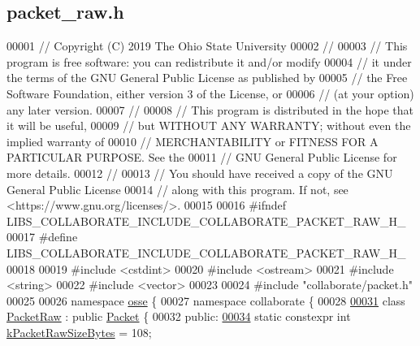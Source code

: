 \hypertarget{packet__raw_8h_source}{}\subsection{packet\+\_\+raw.\+h}
\label{packet__raw_8h_source}

\begin{DoxyCode}
00001 \textcolor{comment}{// Copyright (C) 2019 The Ohio State University}
00002 \textcolor{comment}{//}
00003 \textcolor{comment}{// This program is free software: you can redistribute it and/or modify}
00004 \textcolor{comment}{// it under the terms of the GNU General Public License as published by}
00005 \textcolor{comment}{// the Free Software Foundation, either version 3 of the License, or}
00006 \textcolor{comment}{// (at your option) any later version.}
00007 \textcolor{comment}{//}
00008 \textcolor{comment}{// This program is distributed in the hope that it will be useful,}
00009 \textcolor{comment}{// but WITHOUT ANY WARRANTY; without even the implied warranty of}
00010 \textcolor{comment}{// MERCHANTABILITY or FITNESS FOR A PARTICULAR PURPOSE.  See the}
00011 \textcolor{comment}{// GNU General Public License for more details.}
00012 \textcolor{comment}{//}
00013 \textcolor{comment}{// You should have received a copy of the GNU General Public License}
00014 \textcolor{comment}{// along with this program.  If not, see <https://www.gnu.org/licenses/>.}
00015 
00016 \textcolor{preprocessor}{#ifndef LIBS\_COLLABORATE\_INCLUDE\_COLLABORATE\_PACKET\_RAW\_H\_}
00017 \textcolor{preprocessor}{#define LIBS\_COLLABORATE\_INCLUDE\_COLLABORATE\_PACKET\_RAW\_H\_}
00018 
00019 \textcolor{preprocessor}{#include <cstdint>}
00020 \textcolor{preprocessor}{#include <ostream>}
00021 \textcolor{preprocessor}{#include <string>}
00022 \textcolor{preprocessor}{#include <vector>}
00023 
00024 \textcolor{preprocessor}{#include "collaborate/packet.h"}
00025 
00026 \textcolor{keyword}{namespace }\hyperlink{namespaceosse}{osse} \{
00027 \textcolor{keyword}{namespace }collaborate \{
00028 
\hyperlink{classosse_1_1collaborate_1_1_packet_raw}{00031} \textcolor{keyword}{class }\hyperlink{classosse_1_1collaborate_1_1_packet_raw}{PacketRaw} : \textcolor{keyword}{public} \hyperlink{classosse_1_1collaborate_1_1_packet}{Packet} \{
00032  \textcolor{keyword}{public}:
\hyperlink{classosse_1_1collaborate_1_1_packet_raw_a3f648bbe36363c7698b578199a7cbfc0}{00034}   \textcolor{keyword}{static} constexpr \textcolor{keywordtype}{int} \hyperlink{classosse_1_1collaborate_1_1_packet_raw_a3f648bbe36363c7698b578199a7cbfc0}{kPacketRawSizeBytes} = 108;

\end{DoxyCode}
